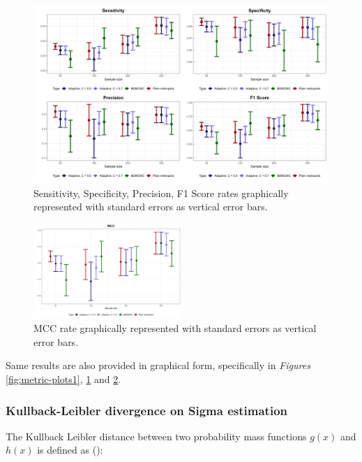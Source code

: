 \documentclass{report}
\begin{document}
\begin{figure}[h] 
	\centering
	\includegraphics[width=1.0\textwidth]{Figures/Overall_comparison/metric_plots2.png}
	\caption{Sensitivity, Specificity, Precision, F1 Score rates graphically represented with standard errors as vertical error bars.}
	\label{fig:metric-plots2}
\end{figure}

\begin{figure}[h] 
	\centering
	\includegraphics[width=0.5\textwidth]{Figures/Overall_comparison/MCC.png}
	\caption{MCC rate graphically represented with standard errors as vertical error bars.}
	\label{fig:metric-mmc}
\end{figure}

Same results are also provided in graphical form, specifically in \textit{Figures} \ref{fig:metric-plots1}, \ref{fig:metric-plots2} and \ref{fig:metric-mmc}.

\subsubsection{Kullback-Leibler divergence on Sigma estimation}

The Kullback Leibler distance between two probability mass functions $g(x)$ and $h(x)$ is defined as (\citet{cover1999elements}):
\end{document}
